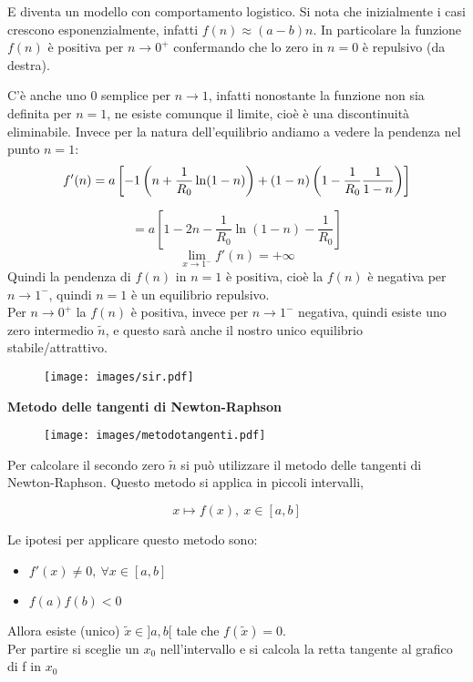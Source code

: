 \documentclass[Main.tex]{subfiles}
\begin{document}
\begin{appendic}
E diventa un modello con comportamento logistico. Si nota che inizialmente i casi crescono esponenzialmente, infatti $f(n)\approx (a-b)n$. In particolare la funzione $f(n)$ è positiva per $n\rightarrow 0^+$ confermando che lo zero in $n=0$ è repulsivo (da destra).

C'è anche uno 0 semplice per $n \rightarrow 1$, infatti nonostante la funzione non sia definita per $n=1$, ne esiste comunque il limite, cioè è una discontinuità eliminabile. Invece per la natura dell'equilibrio andiamo a vedere la pendenza nel punto $n=1$:
\begin{equation} \notag
  f'(n) = a \left[-1 \left(n + \frac{1}{R_0} \ln(1-n)\right) + (1-n)\left(1- \frac{1}{R_0} \frac{1}{1-n} \right) \right]
\end{equation}

\begin{equation}
  =a \left[1-2n - \frac{1}{R_0} \ln(1-n) - \frac{1}{R_0} \right]
\end{equation}
\begin{equation}
  \lim_{x \rightarrow 1^-} f'(n) = + \infty
\end{equation}
Quindi la pendenza di $f(n)$ in $n=1$ è positiva, cioè la $f(n)$ è negativa per $n\rightarrow 1^-$, quindi $n=1$ è un equilibrio repulsivo.\\
Per $n\rightarrow 0^+$ la $f(n)$ è positiva, invece per $n \rightarrow 1^-$ negativa, quindi esiste uno zero intermedio $\tilde n$, e questo sarà anche il nostro unico equilibrio stabile/attrattivo.

\begin{figure}[H]
    \centering
  \texttt{[image: images/sir.pdf]}
\end{figure}

\newpage \noindent 
\textbf{Metodo delle tangenti di Newton-Raphson}\\
 
\begin{figure}[H]
    \centering
  \texttt{[image: images/metodotangenti.pdf]}
\end{figure}   	
Per calcolare il secondo zero $\tilde n$ si può utilizzare il metodo delle tangenti di Newton-Raphson. Questo metodo si applica in piccoli intervalli,

\begin{equation}
  x \mapsto f(x), \ x \in [a, b]
\end{equation}

Le ipotesi per applicare questo metodo sono:
\begin{itemize}
	\item $
f'(x) \neq 0, \ \forall x \in [a,b]
$
\item $
f(a)f(b)<0
$
\end{itemize}
Allora esiste (unico) $\tilde x \in ]a,b[$ tale che $f(\tilde x)=0$.\\
Per partire si sceglie un $x_0$ nell'intervallo e si calcola la retta tangente al grafico di f in $x_0$


\end{appendic}
\end{document}
